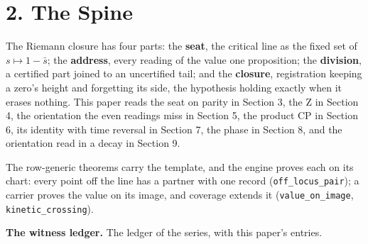 \documentclass[10pt]{article}
\begin{document}
\hypertarget{the-spine}{%
\section{2. The Spine}\label{the-spine}}

The Riemann closure has four parts: the \textbf{seat}, the critical line
as the fixed set of \(s\mapsto1-\bar s\); the \textbf{address}, every
reading of the value one proposition; the \textbf{division}, a certified
part joined to an uncertified tail; and the \textbf{closure},
registration keeping a zero's height and forgetting its side, the
hypothesis holding exactly when it erases nothing. This paper reads the
seat on parity in Section 3, the Z in Section 4, the orientation the
even readings miss in Section 5, the product CP in Section 6, its
identity with time reversal in Section 7, the phase in Section 8, and
the orientation read in a decay in Section 9.

The row-generic theorems carry the template, and the engine proves each
on its chart: every point off the line has a partner with one record
(\texttt{off\_locus\_pair}); a carrier proves the value on its image,
and coverage extends it (\texttt{value\_on\_image},
\texttt{kinetic\_crossing}).

\textbf{The witness ledger.} The ledger of the series, with this paper's
entries.

\begingroup\scriptsize
\end{document}
